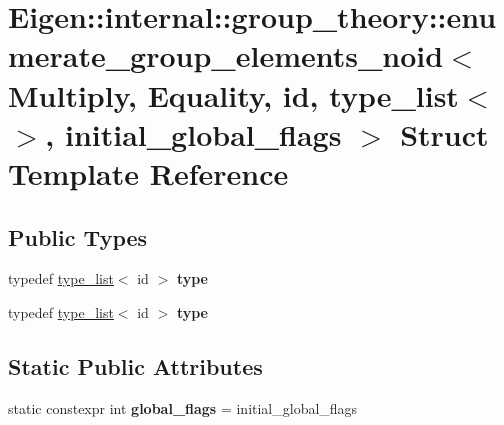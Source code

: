 \hypertarget{struct_eigen_1_1internal_1_1group__theory_1_1enumerate__group__elements__noid_3_01_multiply_00_0fbeb6252744622d4e917105540d8e4a3}{}\section{Eigen\+:\+:internal\+:\+:group\+\_\+theory\+:\+:enumerate\+\_\+group\+\_\+elements\+\_\+noid$<$ Multiply, Equality, id, type\+\_\+list$<$$>$, initial\+\_\+global\+\_\+flags $>$ Struct Template Reference}
\label{struct_eigen_1_1internal_1_1group__theory_1_1enumerate__group__elements__noid_3_01_multiply_00_0fbeb6252744622d4e917105540d8e4a3}
\subsection*{Public Types}
\begin{DoxyCompactItemize}
\item 
\mbox{\label{struct_eigen_1_1internal_1_1group__theory_1_1enumerate__group__elements__noid_3_01_multiply_00_0fbeb6252744622d4e917105540d8e4a3_af4227640204d535ba372c9ea98c940e1}} 
typedef \hyperlink{struct_eigen_1_1internal_1_1type__list}{type\+\_\+list}$<$ id $>$ {\bfseries type}
\item 
\mbox{\label{struct_eigen_1_1internal_1_1group__theory_1_1enumerate__group__elements__noid_3_01_multiply_00_0fbeb6252744622d4e917105540d8e4a3_af4227640204d535ba372c9ea98c940e1}} 
typedef \hyperlink{struct_eigen_1_1internal_1_1type__list}{type\+\_\+list}$<$ id $>$ {\bfseries type}
\end{DoxyCompactItemize}
\subsection*{Static Public Attributes}
\begin{DoxyCompactItemize}
\item 
\mbox{\label{struct_eigen_1_1internal_1_1group__theory_1_1enumerate__group__elements__noid_3_01_multiply_00_0fbeb6252744622d4e917105540d8e4a3_a735ca4241cc943b54d8e80fdca6ecd68}} 
static constexpr int {\bfseries global\+\_\+flags} = initial\+\_\+global\+\_\+flags
\end{DoxyCompactItemize}


